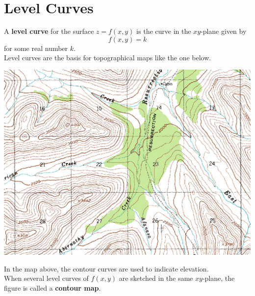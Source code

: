 \documentclass[handout]{ximera}
\begin{document}
\section{Level Curves}
A \textbf{level curve} for the surface $z = f(x, y)$ is the curve in the $xy$-plane given by
\[
f(x, y) = k
\]
for some real number $k$.\\
Level curves are the basis for topographical maps like the one below.
\begin{image}
\includegraphics{topographicalmap.jpg}
\end{image}
In the map above, the contour curves are used to indicate elevation.\\
When several level curves of $f(x, y)$ are sketched in the same $xy$-plane, the figure is called a \textbf{contour map}.
\end{document}
